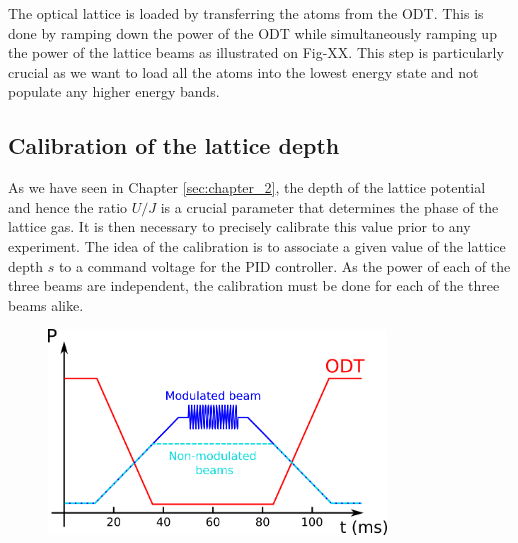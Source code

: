 The optical lattice is loaded by transferring the atoms from the ODT. This is done by ramping down the power of the ODT while simultaneously ramping up the power of the lattice beams as illustrated on Fig-XX. This step is particularly crucial as we want to load all the atoms into the lowest energy state and not populate any higher energy bands. 

 
\subsection{Calibration of the lattice depth}

As we have seen in Chapter \ref{sec:chapter_2}, the depth of the lattice potential and hence the ratio $U/J$ is a crucial parameter that determines the phase of the lattice gas. It is then necessary to precisely calibrate this value prior to any experiment. The idea of the calibration is to associate a given value of the lattice depth $s$ to a command voltage for the PID controller. As the power of each of the three beams are independent, the calibration must be done for each of the three beams alike. 

\begin{figure}
    \centering
    \includegraphics[width=0.8\textwidth]{Fig/Chapter3/modulation.png}
    \caption{}
    \label{fig:my_label}
\end{figure}

